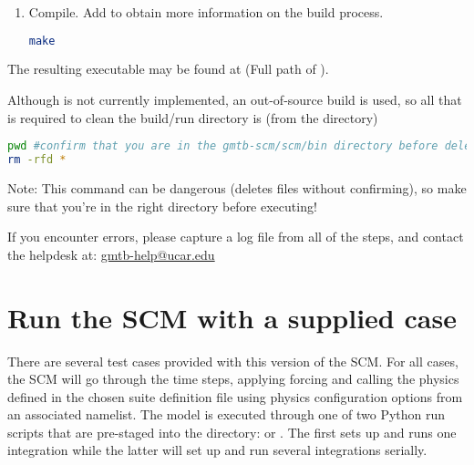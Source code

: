 \begin{enumerate}
If necessary, the CCPP prebuild script can be executed manually from the top level directory (). The basic syntax is
\begin{lstlisting}[language=bash]
./ccpp/framework/scripts/ccpp_prebuild.py --config=./ccpp/config/ccpp_prebuild_config.py --static --suites=SCM_GFS_v15p2,SCM_GFS_v16beta,SCM_GSD_v1[...] --builddir=./scm/bin [--debug]
\end{lstlisting}
where the argument supplied via the  variable is a comma-separated list of suite names that exist in the  directory. Note that suite names are the suite definition filenames minus the  prefix and  suffix.

\item Compile. Add  to obtain more information on the build process.
\begin{lstlisting}[language=bash]
make
\end{lstlisting}
\end{enumerate}

The resulting executable may be found at  (Full path of ).

Although  is not currently implemented, an out-of-source build is used, so all that is required to clean the build/run directory is (from the  directory)
\begin{lstlisting}[language=bash]
pwd #confirm that you are in the gmtb-scm/scm/bin directory before deleting files
rm -rfd *
\end{lstlisting}
Note: This command can be dangerous (deletes files without confirming), so make sure that you're in the right directory before executing!

If you encounter errors, please capture a log file from all of the steps, and contact the helpdesk at: \url{gmtb-help@ucar.edu}

\section{Run the SCM with a supplied case}
There are several test cases provided with this version of the SCM. For all cases, the SCM will go through the time steps, applying forcing and calling the physics defined in the chosen suite definition file using physics configuration options from an associated namelist. The model is executed through one of two Python run scripts that are pre-staged into the  directory:  or . The first sets up and runs one integration while the latter will set up and run several integrations serially.

